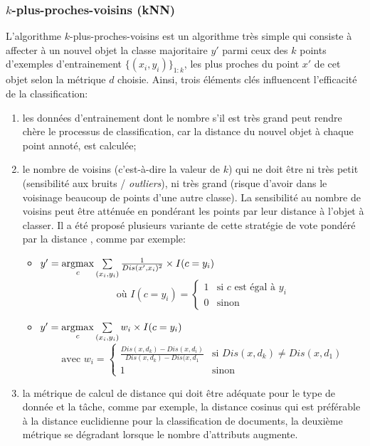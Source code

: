 \subsubsection{$k$-plus-proches-voisins (kNN)}
L'algorithme $k$-plus-proches-voisins est un algorithme très simple qui consiste à affecter à un nouvel objet la classe majoritaire $y'$ parmi ceux des $k$ points d'exemples d'entrainement $\lbrace (x_i,y_i) \rbrace_{1:k}$, les plus proches du point $x'$ de cet objet selon la métrique $d$ choisie. Ainsi, trois éléments clés influencent l'efficacité de la classification:
\begin{enumerate}
	\item les données d'entrainement dont le nombre s'il est très grand peut rendre chère le processus de classification, car la distance du nouvel objet à chaque point annoté, est calculée;
	\item le nombre de voisins (c'est-à-dire la valeur de $k$) qui ne doit être ni très petit (sensibilité aux bruits / \textit{outliers}), ni très grand (risque d'avoir dans le voisinage beaucoup de points d'une autre classe). La sensibilité au nombre de voisins peut être atténuée en pondérant les points par leur distance à l'objet à classer. Il a été proposé plusieurs variante de cette stratégie de \og vote pondéré par la distance \fg{}, comme par exemple:
	\begin{itemize}
		\item $y' = \mathop{\mathrm{argmax}}\limits\limits_c \sum\limits_{(x_i,y_i)} \frac{1}{Dis(x', x_i)^2} \times I(c = y_i)$  \citep{dudani1976originalwknn} \[\text{ où } I(c=y_i) = \left\lbrace \begin{array}{ll}
		1 & \text{si }c \text{ est égal à } y_i \\
		0 & \text{sinon}
		\end{array} \right.\]
		\item $y' = \mathop{\mathrm{argmax}}\limits\limits_c \sum\limits_{(x_i,y_i)} w_i \times I(c = y_i)$ \citep{gou2011wknn} \[\text{ avec } w_i = \left\lbrace \begin{array}{ll}
		\frac{Dis(x, d_k) - Dis(x, d_i)}{Dis(x, d_k) - Dis(x, d_1} & \text{si } Dis(x, d_k) \neq Dis(x, d_1) \\
		1 & \text{sinon}
		\end{array} \right.\]
	\end{itemize}
	 
	\item la métrique de calcul de distance qui doit être adéquate pour le type de donnée et la tâche, comme par exemple, la distance cosinus qui est préférable à la distance euclidienne pour la classification de documents, la deuxième métrique se dégradant lorsque le nombre d'attributs augmente.
\end{enumerate}


